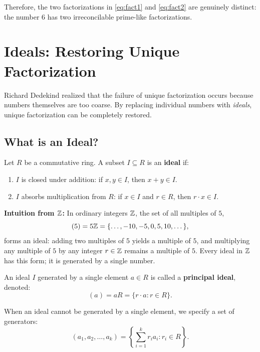 \documentclass[a4paper]{article}
\begin{document}
Therefore, the two factorizations in \eqref{eq:fact1} and \eqref{eq:fact2} are genuinely distinct: the number $6$ has two irreconcilable prime-like factorizations.

\section{Ideals: Restoring Unique Factorization}
Richard Dedekind realized that the failure of unique factorization occurs because numbers themselves are too coarse. By replacing individual numbers with \emph{ideals}, unique factorization can be completely restored.

\subsection{What is an Ideal?}
\begin{definition}[Ideal]
Let $R$ be a commutative ring. A subset $I \subseteq R$ is an \textbf{ideal} if:
\begin{enumerate}[label=(\roman*)]
 \item $I$ is closed under addition: if $x, y \in I$, then $x + y \in I$.
 \item $I$ absorbs multiplication from $R$: if $x \in I$ and $r \in R$, then $r \cdot x \in I$.
\end{enumerate}
\end{definition}

\noindent\textbf{Intuition from $\mathbb{Z}$:} In ordinary integers $\mathbb{Z}$, the set of all multiples of $5$,
\begin{equation}
 (5) = 5\mathbb{Z} = \{\dots, -10, -5, 0, 5, 10, \dots\},
\end{equation}
forms an ideal: adding two multiples of $5$ yields a multiple of $5$, and multiplying any multiple of $5$ by any integer $r \in \mathbb{Z}$ remains a multiple of $5$. Every ideal in $\mathbb{Z}$ has this form; it is generated by a single number.

\begin{definition}
An ideal $I$ generated by a single element $a \in R$ is called a \textbf{principal ideal}, denoted:
\begin{equation}
 (a) = aR = \{r \cdot a : r \in R\}.
\end{equation}
\end{definition}

When an ideal cannot be generated by a single element, we specify a set of generators:
\begin{equation}
 (a_1, a_2, \dots, a_k) = \left\{ \sum_{i=1}^k r_i a_i : r_i \in R \right\}.
\end{equation}
\end{document}
